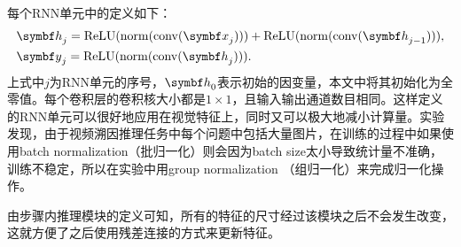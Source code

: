每个RNN单元中的定义如下：
\begin{equation}
    \begin{split}    
    &\vh_{j} = \relu(\norm(\conv(\vx_{j}))) + \relu(\norm(\conv(\vh_{j-1}))),\\
        &\vy_j = \relu(\norm(\conv(\vh_j))).
    \end{split}
\end{equation}
上式中$j$为RNN单元的序号，$\vh_{0}$表示初始的因变量，本文中将其初始化为全零值。每个卷积层的卷积核大小都是$1\times 1$，且输入输出通道数目相同。这样定义的RNN单元可以很好地应用在视觉特征上，同时又可以极大地减小计算量。实验发现，由于视频溯因推理任务中每个问题中包括大量图片，在训练的过程中如果使用batch normalization（批归一化）则会因为batch size太小导致统计量不准确，训练不稳定，所以在实验中用group normalization （组归一化）来完成归一化操作。

由步骤内推理模块的定义可知，所有的特征的尺寸经过该模块之后不会发生改变，这就方便了之后使用残差连接的方式来更新特征。

